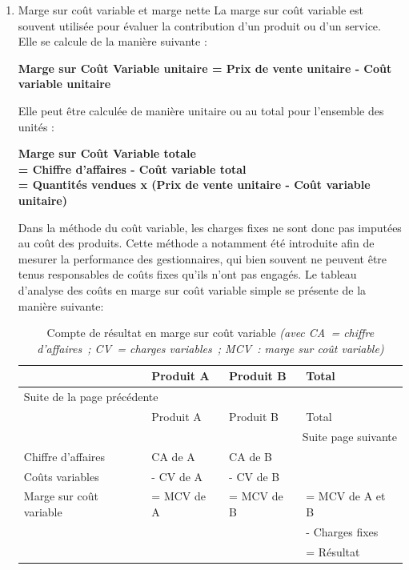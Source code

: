 \documentclass{tufte-handout}
\begin{document}
\begin{enumerate}
\item Marge sur coût variable et marge nette
\label{sec:org7aa6b03}
La marge sur coût variable est souvent utilisée pour évaluer la contribution d'un produit ou d'un service. Elle se calcule de la manière suivante :\\
\begin{center}
\textbf{Marge sur Coût Variable unitaire = Prix de vente unitaire - Coût variable unitaire}\\
\end{center}
Elle peut être calculée de manière unitaire ou au total pour l'ensemble des unités :\\
\begin{center}
\textbf{Marge sur Coût Variable totale}\\
\textbf{= Chiffre d'affaires - Coût variable total}\\
\textbf{= Quantités vendues x (Prix de vente unitaire - Coût variable unitaire)}\\
\end{center}
Dans la méthode du coût variable, les charges fixes ne sont donc pas imputées au coût des produits. Cette méthode a notamment été introduite afin de mesurer la performance des gestionnaires, qui bien souvent ne peuvent être tenus responsables de coûts fixes qu'ils n'ont pas engagés. Le tableau d'analyse des coûts en marge sur coût variable simple se présente de la manière suivante:\\
\begin{longtable}{llll}
\caption{Compte de résultat en marge sur coût variable \emph{(avec CA = chiffre d'affaires ; CV = charges variables ; MCV : marge sur coût variable)}}
\\
 & Produit A & Produit B & Total\\
\hline
\endfirsthead
\multicolumn{4}{l}{Suite de la page précédente} \\
\hline

 & Produit A & Produit B & Total \\

\hline
\endhead
\hline\multicolumn{4}{r}{Suite page suivante} \\
\endfoot
\endlastfoot
\hline
Chiffre d'affaires & CA de A & CA de B & \\
Coûts variables & - CV de A & - CV de B & \\
Marge sur coût variable & = MCV de A & = MCV de B & = MCV de A et B\\
 &  &  & - Charges fixes\\
 &  &  & = Résultat\\
\end{longtable}


\end{enumerate}
\end{document}
